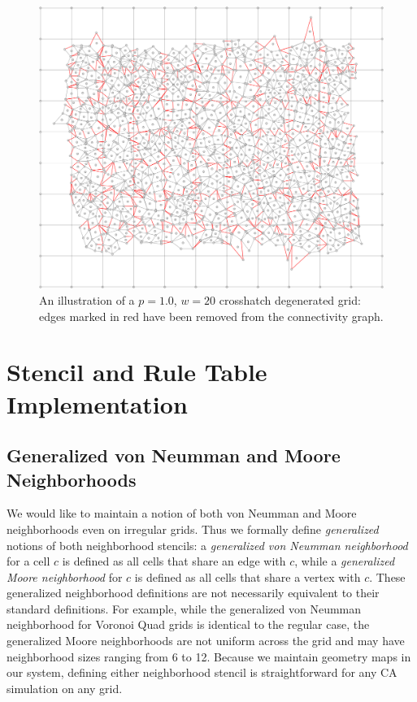 \documentclass[a4paper,11pt]{report}
\begin{document}
\begin{figure}[htp]
\centering
\includegraphics[width=1.0\textwidth]{ch3_figs/ch_p100_w20}
\caption[Crosshatching Degeneration]{
	An illustration of a $p=1.0$, $w=20$ crosshatch degenerated grid: edges marked in red have been removed from the connectivity graph.
}
\label{fig:crosshatch_degen}
\end{figure}

\section{Stencil and Rule Table Implementation}
\label{sec:StencilGen}
\subsection{Generalized von Neumman and Moore Neighborhoods}
We would like to maintain a notion of both von Neumman and Moore neighborhoods even on irregular grids. Thus we formally define \textit{generalized} notions of both neighborhood stencils: a \textit{generalized von Neumman neighborhood} for a cell $c$ is defined as all cells that share an edge with $c$, while a \textit{generalized Moore neighborhood} for $c$ is defined as all cells that share a vertex with $c$. These generalized neighborhood definitions are not necessarily equivalent to their standard definitions. For example, while the generalized von Neumman neighborhood for Voronoi Quad grids is identical to the regular case, the generalized Moore neighborhoods are not uniform across the grid and may have neighborhood sizes ranging from 6 to 12. Because we maintain geometry maps in our system, defining either neighborhood stencil is straightforward for any CA simulation on any grid.
\end{document}
